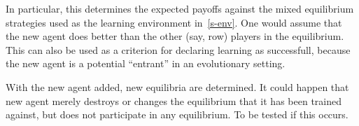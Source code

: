 \documentclass[a4paper,12pt]{article}  %
\theoremstyle{definition}
\begin{document}
In particular, this determines the expected payoffs against
the mixed equilibrium strategies used as the learning
environment in~\ref{s-env}.
One would assume that the new agent does better than the
other (say, row) players in the equilibrium.
This can also be used as a criterion for declaring learning
as successfull, because the new agent is a potential
``entrant'' in an evolutionary setting.

With the new agent added, new equilibria are determined.
It could happen that new agent merely destroys or changes the
equilibrium that it has been trained against, but does not
participate in any equilibrium.
To be tested if this occurs.

% 
% 
% 

% 
% 
% 
\end{document}
